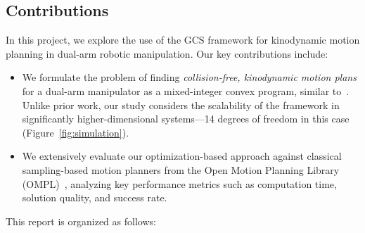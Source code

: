 \subsection{Contributions}
In this project, we explore the use of the GCS framework for kinodynamic motion planning in dual-arm robotic manipulation.
%
Our key contributions include:
\begin{itemize}
    \item We formulate the problem of finding \textit{collision-free, kinodynamic motion plans} for a dual-arm manipulator as a mixed-integer convex program, similar to~\cite{marcucci2023motion}.
    Unlike prior work, our study considers the scalability of the framework in significantly higher-dimensional systems---14 degrees of freedom in this case (Figure~\ref{fig:simulation}).
    \item We extensively evaluate our optimization-based approach against classical sampling-based motion planners from the Open Motion Planning Library (OMPL)~\cite{sucan2012open}, analyzing key performance metrics such as computation time, solution quality, and success rate.
\end{itemize}

This report is organized as follows:
